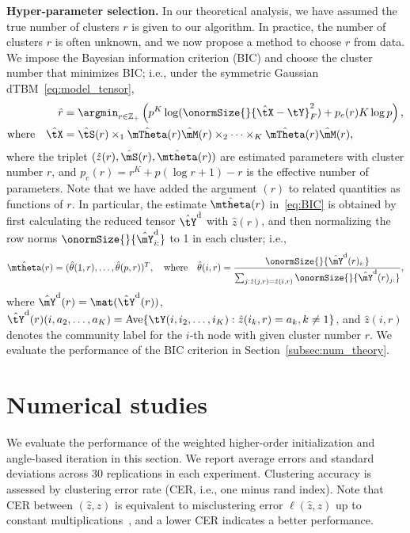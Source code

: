 \documentclass[lettersize,onecolumn,journal]{IEEEtran}
\theoremstyle{definition}
\theoremstyle{definition}
\newcommand{\of}[1]{\left(#1\right)}
\begin{document}
{\bf Hyper-parameter selection.} In our theoretical analysis, we have assumed the true number of clusters $r$ is given to our algorithm. In practice, the number of clusters $r$ is often unknown, and we now propose a method to choose $r$ from data. We impose the Bayesian information criterion (BIC) and choose the cluster number that minimizes BIC; i.e., under the symmetric Gaussian dTBM~\eqref{eq:model_tensor},
\begin{align}\label{eq:BIC}
 \hat r &= \argmin_{r \in \mathbb{Z}_+ } \of{p^K \log(\onormSize{}{\hat \tX - \tY}_F^2)  + p_e(r) K \log p},\\
 \text{where}  \quad \hat \tX &= \hat \tS(r) \times_1 \hat \mTheta(r) \hat \mM(r) \times_2 \cdots \times_K \hat \mTheta(r) \hat \mM(r),
\end{align}
where the triplet $(\hat z(r), \hat \mS(r),\hat \mtheta(r))$ are estimated parameters with cluster number $r$, and $p_e (r)= r^K + p(\log r + 1) - r$ is the effective number of parameters. Note that we have added the argument $(r)$ to related quantities as functions of $r$. In particular, the estimate $\hat \mtheta(r)$ in~\eqref{eq:BIC} is obtained by first calculating the reduced tensor $\hat \tY^{\text{d}}$ with $\hat z(r)$, and then normalizing the row norms $\onormSize{}{\hat \mY_{i:}^{\text{d}}}$ to 1 in each cluster; i.e., 
\begin{equation}
 \hat \mtheta(r)=(\hat \theta(1,r),\ldots,\hat \theta(p,r))^T,\quad\text{where}\quad   \hat \theta(i,r) = \frac{\onormSize{}{\hat \mY^{\text{d}}(r)_{i:}}}{\sum_{j: \hat z(j,r) =  \hat z(i,r)} \onormSize{}{\hat \mY^{\text{d}}(r)_{j:}}},
\end{equation}
where $\hat \mY^{\text{d}}(r) = \mat(\hat \tY^{\text{d}}(r))$, $\hat \tY^{\text{d}}(r)(i,a_2,\ldots,a_K) =  \text{Ave}\{\tY(i,i_2,\ldots,i_K): \hat z(i_k, r) = a_k, k \neq 1 \}$, and $\hat z(i,r)$ denotes the community label for the $i$-th node with given cluster number $r$. We evaluate the performance of the BIC criterion in Section~\ref{subsec:num_theory}.


\section{Numerical studies}\label{sec:simulation}

 We evaluate the performance of the weighted higher-order initialization and angle-based iteration in this section. We report average errors and standard deviations across 30 replications in each experiment. Clustering accuracy is assessed by clustering error rate (CER, i.e., one minus rand index). Note that CER between $(\hat z, z)$ is equivalent to misclustering error $\ell(\hat z, z)$ up to constant multiplications~\citep{meilua2012local}, and a lower CER indicates a better performance.
\end{document}
